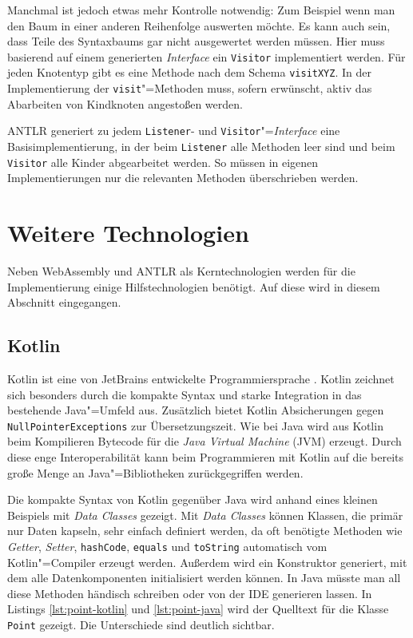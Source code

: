 Manchmal ist jedoch etwas mehr Kontrolle notwendig: Zum Beispiel wenn man den Baum in einer anderen Reihenfolge auswerten möchte. Es kann auch sein, dass Teile des Syntaxbaums gar nicht ausgewertet werden müssen. Hier muss basierend auf einem generierten \emph{Interface} ein \lstinline{Visitor} implementiert werden. Für jeden Knotentyp gibt es eine Methode nach dem Schema \lstinline{visitXYZ}. In der Implementierung der \lstinline{visit}"=Methoden muss, sofern erwünscht, aktiv das Abarbeiten von Kindknoten angestoßen werden.

ANTLR generiert zu jedem \lstinline{Listener}- und \lstinline{Visitor}"=\emph{Interface} eine Basisimplementierung, in der beim \lstinline{Listener} alle Methoden leer sind und beim \lstinline{Visitor} alle Kinder abgearbeitet werden. So müssen in eigenen Implementierungen nur die relevanten Methoden überschrieben werden.

\pagebreak
\section{Weitere Technologien}

Neben WebAssembly und ANTLR als Kerntechnologien werden für die Implementierung einige Hilfstechnologien benötigt. Auf diese wird in diesem Abschnitt eingegangen.
\subsection{Kotlin}
Kotlin ist eine von JetBrains entwickelte Programmiersprache \cite{KotlinReference}. Kotlin zeichnet sich besonders durch die kompakte Syntax und starke Integration in das bestehende Java"=Umfeld aus. Zusätzlich bietet Kotlin Absicherungen gegen \lstinline{NullPointerExceptions} zur Übersetzungszeit. Wie bei Java wird aus Kotlin beim Kompilieren Bytecode für die \emph{Java Virtual Machine} (JVM) erzeugt. Durch diese enge Interoperabilität kann beim Programmieren mit Kotlin auf die bereits große Menge an Java"=Bibliotheken zurückgegriffen werden.

Die kompakte Syntax von Kotlin gegenüber Java wird anhand eines kleinen Beispiels mit \emph{Data Classes} gezeigt. Mit \emph{Data Classes} können Klassen, die primär nur Daten kapseln, sehr einfach definiert werden, da oft benötigte Methoden wie \emph{Getter}, \emph{Setter}, \lstinline{hashCode}, \lstinline{equals} und \lstinline{toString} automatisch vom Kotlin"=Compiler erzeugt werden. Außerdem wird ein Konstruktor generiert, mit dem alle Datenkomponenten initialisiert werden können. In Java müsste man all diese Methoden händisch schreiben oder von der IDE generieren lassen. In Listings \ref{lst:point-kotlin} und \ref{lst:point-java} wird der Quelltext für die Klasse \lstinline{Point} gezeigt. Die Unterschiede sind deutlich sichtbar.

